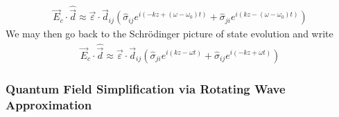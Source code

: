 \documentclass[aps,pra,showpacs,amsmath,amssymb,nofootinbib,longbibliography,superscriptaddress
]{revtex4-1}
\theoremstyle{definition}
\theoremstyle{remark}
\newcommand{\0}{\hat{0}}
\begin{document}
\begin{align}
    \vec{E}_c \cdot \hat{\vec{d}} \approx 
    \vec{\varepsilon} \cdot \vec{d}_{ij} \left(
        \hat{\sigma}_{ij} e^{i(-kz + (\omega - \omega_0) t)} +
        \hat{\sigma}_{ji} e^{i(kz - (\omega - \omega_0) t)}
    \right)
\end{align}
We may then go back to the Schr\"{o}dinger picture of state evolution and write
\begin{align}
    \vec{E}_c \cdot \hat{\vec{d}} \approx 
    \vec{\varepsilon} \cdot \vec{d}_{ij} \left(
        \hat{\sigma}_{ji} e^{i(kz - \omega t)} +
        \hat{\sigma}_{ij} e^{i(-kz + \omega t)}
    \right)
\end{align}

\subsubsection{Quantum Field Simplification via Rotating Wave Approximation}
\end{document}
